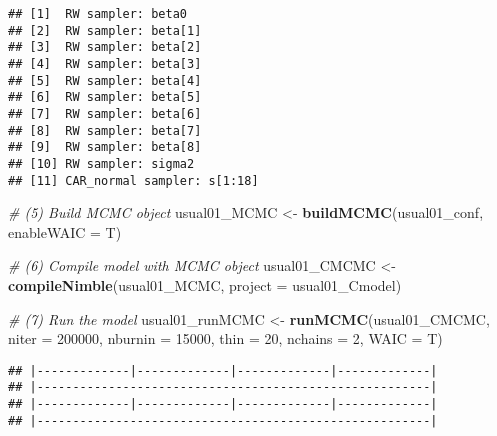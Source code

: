 \documentclass[]{article}
\newenvironment{Shaded}{\begin{snugshade}}{\end{snugshade}}
\newcommand{\CommentTok}[1]{\textcolor[rgb]{0.56,0.35,0.01}{\textit{#1}}}
\newcommand{\DataTypeTok}[1]{\textcolor[rgb]{0.13,0.29,0.53}{#1}}
\newcommand{\DecValTok}[1]{\textcolor[rgb]{0.00,0.00,0.81}{#1}}
\newcommand{\KeywordTok}[1]{\textcolor[rgb]{0.13,0.29,0.53}{\textbf{#1}}}
\newcommand{\NormalTok}[1]{#1}
\newcommand{\OperatorTok}[1]{\textcolor[rgb]{0.81,0.36,0.00}{\textbf{#1}}}
\newcommand{\StringTok}[1]{\textcolor[rgb]{0.31,0.60,0.02}{#1}}
\begin{document}
\begin{Shaded}
\end{Shaded}

\begin{verbatim}
## [1]  RW sampler: beta0
## [2]  RW sampler: beta[1]
## [3]  RW sampler: beta[2]
## [4]  RW sampler: beta[3]
## [5]  RW sampler: beta[4]
## [6]  RW sampler: beta[5]
## [7]  RW sampler: beta[6]
## [8]  RW sampler: beta[7]
## [9]  RW sampler: beta[8]
## [10] RW sampler: sigma2
## [11] CAR_normal sampler: s[1:18]
\end{verbatim}

\begin{Shaded}
\begin{Highlighting}[]
\CommentTok{# (5) Build MCMC object}
\NormalTok{usual01_MCMC <-}\StringTok{ }\KeywordTok{buildMCMC}\NormalTok{(usual01_conf, }\DataTypeTok{enableWAIC =}\NormalTok{ T) }

\CommentTok{# (6) Compile model with MCMC object}
\NormalTok{usual01_CMCMC <-}\StringTok{ }\KeywordTok{compileNimble}\NormalTok{(usual01_MCMC, }\DataTypeTok{project =}\NormalTok{ usual01_Cmodel)  }

\CommentTok{# (7) Run the model}
\NormalTok{usual01_runMCMC <-}\StringTok{ }\KeywordTok{runMCMC}\NormalTok{(usual01_CMCMC, }\DataTypeTok{niter =} \DecValTok{200000}\NormalTok{, }\DataTypeTok{nburnin =} \DecValTok{15000}\NormalTok{, }\DataTypeTok{thin =} \DecValTok{20}\NormalTok{, }\DataTypeTok{nchains =} \DecValTok{2}\NormalTok{, }\DataTypeTok{WAIC =}\NormalTok{ T)}
\end{Highlighting}
\end{Shaded}

\begin{verbatim}
## |-------------|-------------|-------------|-------------|
## |-------------------------------------------------------|
## |-------------|-------------|-------------|-------------|
## |-------------------------------------------------------|
\end{verbatim}
\end{document}
